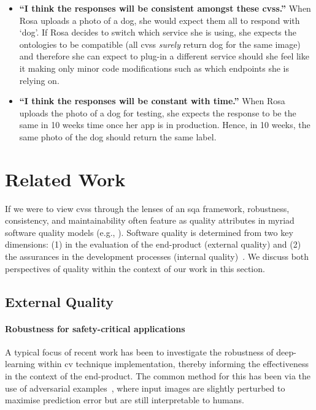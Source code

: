 \begin{itemize}
  \item \textbf{``I think the responses will be consistent amongst these \glspl{cvs}.''} When Rosa uploads a photo of a dog, she would expect them all to respond with `dog'. If Rosa decides to switch which service she is using, she expects the ontologies to be compatible (all \glspl{cvs} \textit{surely} return dog for the same image) and therefore she can expect to plug-in a different service should she feel like it making only minor code modifications such as which endpoints she is relying on.
  \item \textbf{``I think the responses will be constant with time.''} When Rosa uploads the photo of a dog for testing, she expects the response to be the same in 10 weeks time once her app is in production. Hence, in 10 weeks, the same photo of the dog should return the same label.
\end{itemize}

\section{Related Work}
\label{icsme2019:sec:related-work}

If we were to view \glspl{cvs} through the lenses of an \gls{sqa} framework, robustness, consistency, and maintainability often feature as quality attributes in myriad software quality models (e.g., \citep{ISO9126:1999}). Software quality is determined from two key dimensions: (1) in the evaluation of the end-product (external quality) and (2) the assurances in the development processes (internal quality)~\citep{Pressman:2005vf}.  We discuss both perspectives of quality within the context of our work in this section.

\subsection{External Quality}

\paragraph{Robustness for safety-critical applications}
A typical focus of recent work has been to investigate the robustness of deep-learning within \gls{cv} technique implementation, thereby informing the effectiveness in the context of the end-product. The common method for this has been via the use of adversarial examples~\citep{Szegedy:2013vw}, where input images are slightly perturbed to maximise prediction error but are still interpretable to humans.

